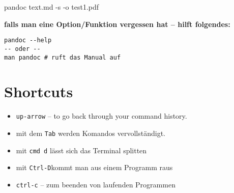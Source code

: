 \documentclass[]{article}
\begin{document}
pandoc text.md -s -o test1.pdf

\textbf{falls man eine Option/Funktion vergessen hat -- hilft
folgendes:}

\begin{verbatim}
pandoc --help
-- oder -- 
man pandoc # ruft das Manual auf
\end{verbatim}

\section{Shortcuts}\label{shortcuts}

\begin{itemize}
\itemsep1pt\parskip0pt
\item
  \texttt{up-arrow} -- to go back through your command history.
\item
  mit dem \texttt{Tab} werden Komandos vervollständigt.
\item
  mit \texttt{cmd d} lässt sich das Terminal splitten
\item
  mit \texttt{Ctrl-D}kommt man aus einem Programm raus
\item
  \texttt{ctrl-c} -- zum beenden von laufenden Programmen
\end{itemize}
\end{document}
